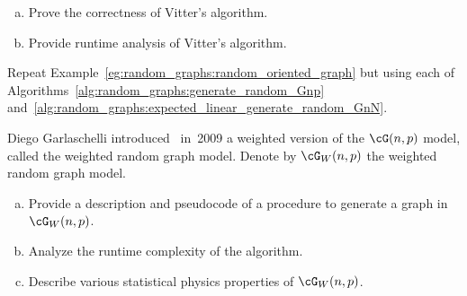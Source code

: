\begin{problem}
\begin{enumerate}[(a)]
  \item Prove the correctness of Vitter's algorithm.

  \item Provide runtime analysis of Vitter's algorithm.
  \end{enumerate}

\item Repeat Example~\ref{eg:random_graphs:random_oriented_graph} but
  using each of Algorithms~\ref{alg:random_graphs:generate_random_Gnp}
  and~\ref{alg:random_graphs:expected_linear_generate_random_GnN}.

\item Diego Garlaschelli
  introduced~\cite{Garlaschelli2009} in~2009 a weighted version of the
  $\cG(n,p)$ model, called the weighted
  random graph model. Denote by $\cG_W(n,p)$ the weighted random graph
  model.
  \begin{enumerate}[(a)]
  \item Provide a description and pseudocode of a procedure to
    generate a graph in $\cG_W(n,p)$.

  \item Analyze the runtime complexity of the algorithm.

  \item Describe various statistical physics properties of $\cG_W(n,p)$.
  \end{enumerate}
\end{problem}
